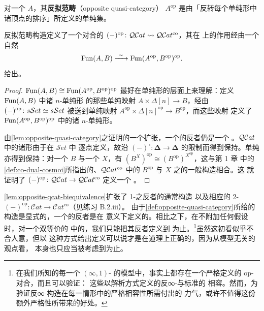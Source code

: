 \begin{definition}\label{def:opposite-quasi-category}
对一个\trQuasiCategory{} $A$，其\textbf{反拟范畴}（opposite quasi-category）
$A^{\mathrm{op}}$ 是由「反转每个单纯形中诸顶点的排序」所定义的单纯集。
\end{definition}

\begin{lemma}\label{lem:opposite-qcat-biequivalence}
反拟范畴构造定义了一个对合的\trCosmologicalBiequivalence{}
$(-)^{\mathrm{op}}\colon\mathcal{Q}\mathcal{C}at\rightsquigarrow\mathcal{Q}\mathcal{C}at^{\mathrm{co}}$，其在%
\trFunctorSpace{}上的作用经由一个自然\trIsomorphism
\[
\Fun(A,B)\xrightarrow{\ \sim\ }\Fun(A^{\mathrm{op}},B^{\mathrm{op}})^{\mathrm{op}}.
\]
给出。
\end{lemma}

\begin{proof}
\trIsomorphism{} $\operatorname{Fun}(A,B)\cong\operatorname{Fun}(A^{\mathrm{op}},B^{\mathrm{op}})^{\mathrm{op}}$
最好在单纯形的层面上来理解：定义\trFunctorSpace{} $\operatorname{Fun}(A,B)$ 中诸 $n$-单纯形
的那些单纯映射 $A\times\Delta[n]\to B$，经由\trIsomorphism{}
$(-)^{\mathrm{op}}\colon s\mathcal{S}et\simeq s\mathcal{S}et$ 被送到单纯映射
$A^{\mathrm{op}}\times\Delta[n]^{\mathrm{op}}\to B^{\mathrm{op}}$，而这些映射
定义了\trFunctorSpace{} $\operatorname{Fun}(A^{\mathrm{op}},B^{\mathrm{op}})^{\mathrm{op}}$
中的诸 $n$-单纯形。

由\cref{lem:opposite-quasi-category}之证明的一个扩张，一个\trIsofibration{}的反者仍是一个%
\trIsofibration。$\mathcal{Q}\mathcal{C}at$ 中的诸\trCone{}形\trLimit{}由于在 $\mathcal{S}et$ 中
逐点定义，故沿\trFunctor{} $(-)^{\circ}\colon\boldsymbol{\Delta}\to\boldsymbol{\Delta}$
的限制而得到保持。单纯\trCotensor{}亦得到保持：对一个\trQuasiCategory{} $B$
与一个\trSimplicialSet{} $X$，有
$(B^{X})^{\mathrm{op}}\cong(B^{\mathrm{op}})^{X^{\mathrm{op}}}$，这与第 1 章
中的\cref{def:co-dual-cosmoi}所指出的、$\mathcal{Q}\mathcal{C}at^{\mathrm{co}}$ 中的
$B^{\mathrm{op}}$ 与\trSimplicialSet{} $X$ 之\trCotensor{}的一般构造相合。这
就证明了 $(-)^{\mathrm{op}}\colon\mathcal{Q}\mathcal{C}at\to\mathcal{Q}\mathcal{C}at^{\mathrm{co}}$ 定义一个%
\trCosmologicalFunctor。
\end{proof}

\cref{lem:opposite-qcat-biequivalence}扩张了 1-\trCategory{}之反者的通常构造
以及相应的 2-\trFunctor{}
$(-)^{\mathrm{op}}\colon\mathcal{C}at\to\mathcal{C}at^{\mathrm{co}}$（见练习
B.2.iii）。%
由于\cref{def:opposite-quasi-category}所给的构造是显式的，一个\trQuasiCategory{}的反者是在%
\trIsomorphism{}意义下定义的。相比之下，在不附加任何假设时，对一个双等价的%
\trInfinityCosmos{}中的\trInfinityCategory，我们只能把其反者定义到%
\trEquivalence{}为止。\footnote{在我们所知的每一个 $(\infty,1)$-%
\trCategory{}的模型中，事实上都存在一个严格定义的 op-对合，而且可以验证：
这些以解析方式定义的反∞-\trCategory{}与标准的\trChangeOfModel{}\trFunctor{}%
相容。然而，为验证反∞-\trCategory{}构造在每一情形中的严格相容性所需付出的
力气，或许不值得这份额外严格性所带来的好处。}虽然这初看似乎不合人意，但以
这种方式给出定义可以说才是在道理上正确的，因为从模型无关的观点看，%
\trInfinityCategory{}本身也只应当被考虑到\trEquivalence{}为止。

